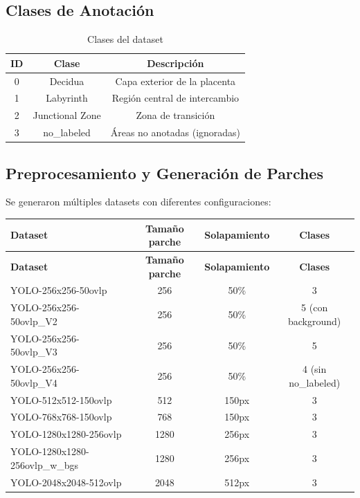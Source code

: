 \documentclass[12pt,a4paper]{article}
\begin{document}
\subsection{Clases de Anotación}

\begin{table}[ht]
\centering
\caption{Clases del dataset}
\label{tab:classes}
\begin{tabular}{@{}ccc@{}}
\toprule
ID & Clase & Descripción \\ \midrule
0 & Decidua & Capa exterior de la placenta \\
1 & Labyrinth & Región central de intercambio \\
2 & Junctional Zone & Zona de transición \\
3 & no\_labeled & Áreas no anotadas (ignoradas) \\
\bottomrule
\end{tabular}
\end{table}

\subsection{Preprocesamiento y Generación de Parches}

Se generaron múltiples datasets con diferentes configuraciones:

\begin{longtable}{|l|c|c|c|}
\hline
\textbf{Dataset} & \textbf{Tamaño parche} & \textbf{Solapamiento} & \textbf{Clases} \\ \hline
\endfirsthead
\hline
\textbf{Dataset} & \textbf{Tamaño parche} & \textbf{Solapamiento} & \textbf{Clases} \\ \hline
\endhead
\hline
\endfoot
\hline
\endlastfoot
YOLO-256x256-50ovlp & 256 & 50\% & 3 \\
YOLO-256x256-50ovlp\_V2 & 256 & 50\% & 5 (con background) \\
YOLO-256x256-50ovlp\_V3 & 256 & 50\% & 5 \\
YOLO-256x256-50ovlp\_V4 & 256 & 50\% & 4 (sin no\_labeled) \\
YOLO-512x512-150ovlp & 512 & 150px & 3 \\
YOLO-768x768-150ovlp & 768 & 150px & 3 \\
YOLO-1280x1280-256ovlp & 1280 & 256px & 3 \\
YOLO-1280x1280-256ovlp\_w\_bgs & 1280 & 256px & 3 \\
YOLO-2048x2048-512ovlp & 2048 & 512px & 3 \\
\end{longtable}
\end{document}
